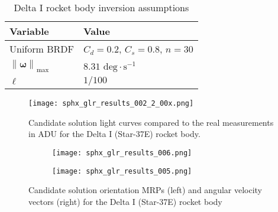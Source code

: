 \documentclass[a4paper,twocolumn]{spaceDebrisC} %
\newcommand{\vctr}[1]{\bm{#1}}
\newcommand{\norm}[1]{\left\lVert#1\right\rVert}
\newcommand{\figbig}[0]{0.5\textwidth}
\newcommand{\figmed}[0]{0.4\textwidth}
\begin{document}
\begin{table}[H]
  \centering
  \caption{Delta I rocket body inversion assumptions}
  \vspace*{6pt}
  \begin{tabular}{|l|l|}
  \hline
  \textbf{Variable} & \textbf{Value} \\ \hline
 Uniform BRDF & $C_d=0.2$, $C_s=0.8$, $n=30$ \\ \hline
 $\norm{\vctr{\omega}}_\text{max}$ & $8.31$ $\text{deg} \cdot \text{s}^{-1}$ \\ \hline
 $\ell$ & $1/100$ \\ \hline
\end{tabular}
  \label{tb:case2_ass}
\end{table}

\begin{figure}[H]
  \centering
  \texttt{[image: sphx\_glr\_results\_002\_2\_00x.png]}
  \caption{Candidate solution light curves compared to the real measurements in ADU for the Delta I (Star-37E) rocket body.}
  \label{fig:case2_s}
\end{figure}


\begin{figure}[H]
  \centering
  \begin{subfigure}[t]{0.23\textwidth}
    \centering
    \texttt{[image: sphx\_glr\_results\_006.png]}
    \caption{}
    \label{fig:case2_pwa}
  \end{subfigure}
  \hfill
  \begin{subfigure}[t]{0.23\textwidth}
    \centering
    \texttt{[image: sphx\_glr\_results\_005.png]}
    \caption{}
    \label{fig:case2_pwb}
  \end{subfigure}

  \caption{Candidate solution orientation MRPs (left) and angular velocity vectors (right) for the Delta I (Star-37E) rocket body}
  \label{fig:case2_pw}
\end{figure}

\end{document}
